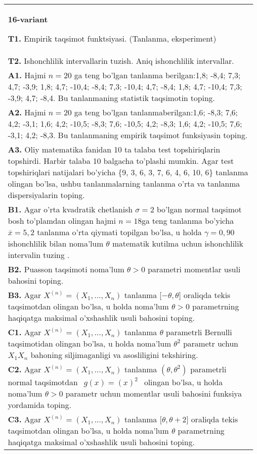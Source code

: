 \documentclass{article}
\begin{document}
\begin{tabular}{m{17cm}}
\textbf{16-variant}
\newline

\textbf{T1.} 
Empirik taqsimot funktsiyasi. (Tanlanma, eksperiment)
\\
\textbf{T2.} 
Ishonchlilik intervallarin tuzish. Aniq ishonchlilik intervallar.
\\
\textbf{A1.} 
Hajmi \(n = 20\) ga teng bo'lgan tanlanma berilgan:1,8; -8,4; 7,3; 4,7; -3,9; 1,8; 4,7; -10,4; -8,4; 7,3; -10,4; 4,7; -8,4; 1,8; 4,7; -10,4; 7,3; -3,9; 4,7; -8,4. Bu tanlanmaning statistik taqsimotin toping.
\\
\textbf{A2.} 
Hajmi \(n = 20\) ga teng bo'lgan tanlanmaberilgan:1,6; -8,3; 7,6; 4,2; -3,1; 1,6; 4,2; -10,5; -8,3; 7,6; -10,5; 4,2; -8,3; 1,6; 4,2; -10,5; 7,6; -3,1; 4,2; -8,3. Bu tanlanmaning empirik taqsimot funksiyasin toping.
\\
\textbf{A3.} 
Oliy matematika fanidan 10 ta talaba test topshiriqlarin topshirdi. Harbir talaba 10 balgacha to'plashi mumkin. Agar test topshiriqlari natijalari bo'yicha \{9, 3, 6, 3, 7, 6, 4, 6, 10, 6\} tanlanma olingan bo'lsa, ushbu tanlanmalarning tanlanma o'rta va tanlanma dispersiyalarin toping.
\\
\textbf{B1.} 
Agar o'rta kvadratik chetlanish \(\sigma = 2\) bo'lgan normal taqsimot bosh to'plamdan olingan hajmi \(n = 18\)ga teng tanlanma bo'yicha \(\overline{x} = 5,2\) tanlanma o'rta qiymati topilgan bo'lsa, u holda \(\gamma = 0,90\) ishonchlilik bilan noma'lum \(\theta\) matematik kutilma uchun ishonchlilik intervalin tuzing .
\\
\textbf{B2.} 
Puasson taqsimoti noma'lum \(\theta > 0\) parametri momentlar usuli bahosini toping.
\\
\textbf{B3.} 
Agar \(X^{(n)} = \left( X_{1},...,X_{n} \right)\) tanlanma \(\lbrack - \theta,\theta\rbrack\) oraliqda tekis taqsimotdan olingan bo'lsa, u holda noma'lum \(\theta > 0\) parametrning haqiqatga maksimal o'xshashlik usuli bahosini toping.
\\
\textbf{C1.} 
Agar \(X^{(n)} = \left( X_{1},...,X_{n} \right)\) tanlanma \(\theta\) parametrli Bernulli taqsimotidan olingan bo'lsa, u holda noma'lum \(\theta^{2}\) parametr uchun \(X_{1}X_{n}\) bahoning siljimaganligi va asosliligini tekshiring.
\\
\textbf{C2.} 
Agar \(X^{(n)} = \left( X_{1},...,X_{n} \right)\) tanlanma \((\theta,\theta^{2})\) parametrli normal taqsimotdan \(\ \ g(x) = (x)^{2}\ \ \) olingan bo'lsa, u holda noma'lum \(\theta > 0\) parametr uchun momentlar usuli bahosini funksiya yordamida toping.
\\
\textbf{C3.} 
Agar \(X^{(n)} = \left( X_{1},...,X_{n} \right)\) tanlanma \(\lbrack\theta,\theta + 2\rbrack\) oraliqda tekis taqsimotdan olingan bo'lsa, u holda noma'lum \(\theta\) parametrning haqiqatga maksimal o'xshashlik usuli bahosini toping.
\\

\end{tabular}
\vspace{1cm}
\end{document}
